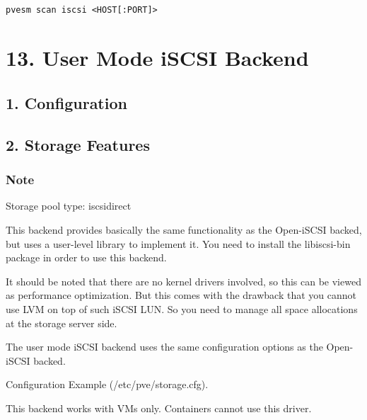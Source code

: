 \begin{lstlisting}

pvesm scan iscsi <HOST[:PORT]>

\end{lstlisting}

\begin{table}[htbp]

\centering

\begin{tabular}

\end{tabular}

\end{table}


\section{13. User Mode iSCSI Backend}

\subsection{1. Configuration}

\subsection{2. Storage Features}

\subsubsection{Note}

Storage pool type: iscsidirect

This backend provides basically the same functionality as the Open-iSCSI backed, but uses a user-level library to implement it. You need to install the libiscsi-bin package in order to use this backend.

It should be noted that there are no kernel drivers involved, so this can be viewed as performance optimization. But this comes with the drawback that you cannot use LVM on top of such iSCSI LUN. So you need to manage all space allocations at the storage server side.

The user mode iSCSI backend uses the same configuration options as the Open-iSCSI backed.

Configuration Example (/etc/pve/storage.cfg).

This backend works with VMs only. Containers cannot use this driver.


